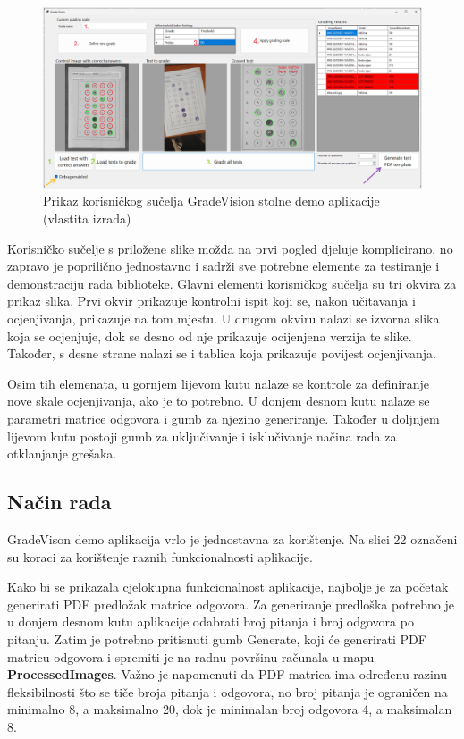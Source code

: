 \documentclass{foi}
\begin{document}
\begin{figure}[H]
\centering
\includegraphics[width=1.0\linewidth]{slike/GradeVision ui.png}
\caption{Prikaz korisničkog sučelja GradeVision stolne demo aplikacije (vlastita izrada)}
\end{figure}

Korisničko sučelje s priložene slike možda na prvi pogled djeluje komplicirano, no zapravo je poprilično jednostavno i sadrži sve potrebne elemente za testiranje i demonstraciju rada biblioteke. Glavni elementi korisničkog sučelja su tri okvira za prikaz slika. Prvi okvir prikazuje kontrolni ispit koji se, nakon učitavanja i ocjenjivanja, prikazuje na tom mjestu. U drugom okviru nalazi se izvorna slika koja se ocjenjuje, dok se desno od nje prikazuje ocijenjena verzija te slike. Također, s desne strane nalazi se i tablica koja prikazuje povijest ocjenjivanja.

Osim tih elemenata, u gornjem lijevom kutu nalaze se kontrole za definiranje nove skale ocjenjivanja, ako je to potrebno. U donjem desnom kutu nalaze se parametri matrice odgovora i gumb za njezino generiranje. Također u doljnjem lijevom kutu postoji gumb za uključivanje i isklučivanje načina rada za otklanjanje grešaka.

\subsection{Način rada}

GradeVison demo aplikacija vrlo je jednostavna za korištenje. Na slici 22 označeni su koraci za korištenje raznih funkcionalnosti aplikacije.

Kako bi se prikazala cjelokupna funkcionalnost aplikacije, najbolje je za početak generirati PDF predložak matrice odgovora. Za generiranje predloška potrebno je u donjem desnom kutu aplikacije odabrati broj pitanja i broj odgovora po pitanju. Zatim je potrebno pritisnuti gumb Generate, koji će generirati PDF matricu odgovora i spremiti je na radnu površinu računala u mapu \textbf{ProcessedImages}. Važno je napomenuti da PDF matrica ima određenu razinu fleksibilnosti što se tiče broja pitanja i odgovora, no broj pitanja je ograničen na minimalno 8, a maksimalno 20, dok je minimalan broj odgovora 4, a maksimalan 8.
\end{document}
